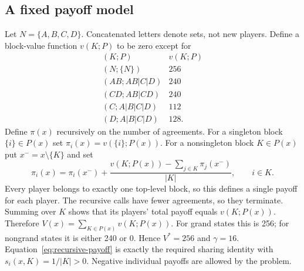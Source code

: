 \documentclass[11pt,a4paper]{article}
\theoremstyle{definition}\newtheorem{definition}[theorem]{Definition}
\theoremstyle{remark}\newtheorem{remark}[theorem]{Remark}
\newcommand{\1}{\mathbf 1}
\begin{document}
\subsection{A fixed payoff model}
Let $N=\{A,B,C,D\}$. Concatenated letters denote sets, not new players. Define a block-value function $v(K;P)$ to be zero except for
\[
\begin{array}{c|r}
(K;P)&v(K;P)\\\hline
(N;\{N\})&256\\
(AB;AB|C|D)&240\\
(CD;AB|CD)&240\\
(C;A|B|C|D)&112\\
(D;A|B|C|D)&128.
\end{array}
\]
Define $\pi(x)$ recursively on the number of agreements. For a singleton block $\{i\}\in P(x)$ set $\pi_i(x)=v(\{i\};P(x))$. For a nonsingleton block $K\in P(x)$ put $x^-=x\setminus\{K\}$ and set
\begin{equation}\label{eq:recursive-payoff}
 \pi_i(x)=\pi_i(x^-)+\frac{v(K;P(x))-\sum_{j\in K}\pi_j(x^-)}{|K|},\qquad i\in K.
\end{equation}
Every player belongs to exactly one top-level block, so this defines a single payoff for each player. The recursive calls have fewer agreements, so they terminate. Summing over $K$ shows that its players' total payoff equals $v(K;P(x))$. Therefore $V(x)=\sum_{K\in P(x)}v(K;P(x))$. For grand states this is 256; for nongrand states it is either 240 or 0. Hence $V^*=256$ and $\gamma=16$. Equation~\eqref{eq:recursive-payoff} is exactly the required sharing identity with $s_i(x,K)=1/|K|>0$. Negative individual payoffs are allowed by the problem.
\end{document}

